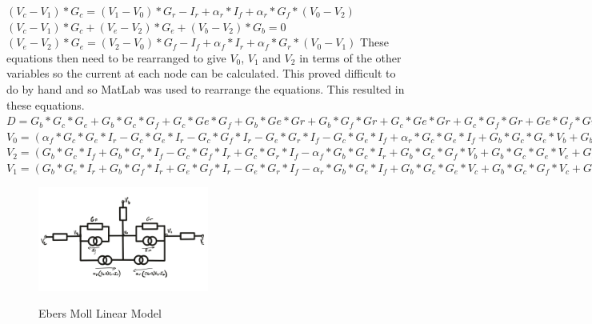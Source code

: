 \documentclass{article}
\begin{document}
$(V_c-V_1)*G_c = (V_1-V_0)*G_r - I_r + \alpha_r*I_f + \alpha_r*G_f*(V_0-V_2)$\bigbreak
$(V_c-V_1)*G_c + (V_e-V_2)*G_e + (V_b-V_2)*G_b = 0$\bigbreak
$(V_e-V_2)*G_e = (V_2-V_0)*G_f - I_f + \alpha_f*I_r + \alpha_f*G_r*(V_0-V_1)$\bigbreak
These equations then need to be rearranged to give $V_0$, $V_1$ and $V_2$ in terms of the other variables so the current at each node can be calculated. This proved difficult to do by hand and so MatLab was used to rearrange the equations. This resulted in these equations.\bigbreak
$D = G_b*G_c*G_e + G_b*G_c*G_f + G_c*Ge*G_f + G_b*Ge*Gr + G_b*G_f*Gr + G_c*Ge*Gr + G_c*G_f*Gr + Ge*G_f*Gr
            - \alpha_f*Gc_*G_e*G_r - \alpha_r*G_c*G_e*G_f - \alpha_f*\alpha_r*G_b*G_f*G_r - \alpha_f*\alpha_r*G_c*G_f*G_r - \alpha_f*\alpha_r*G_e*G_f*G_r$\bigbreak
$V_0 = (\alpha_f*G_c*G_e*I_r - G_c*G_e*I_r - G_c*G_f*I_r - G_e*G_r*I_f - G_c*G_e*I_f + \alpha_r*G_c*G_e*I_f + G_b*G_c*G_e*V_b + G_b*G_c*G_f*V_b + G_c*G_e*G_f*V_e + G_b*G_e*G_r*V_b + G_b*G_f*G_r*V_b + G_c*G_e*G_r*V_c + G_c*G_f*G_r*V_c + G_e*G_f*G_r*V_e + \alpha_f*\alpha_r*G_c*G_f*I_r + 
\alpha_f*\alpha_r*G_e*G_r*I_f - \alpha_f*G_c*G_e*G_r*V_c - \alpha_r*G_c*G_e*G_f*V_e - \alpha_f*\alpha_r*G_b*G_f*G_r*V_b - \alpha_f*\alpha_r*G_c*G_f*G_r*V_c - \alpha_f*\alpha_r*G_e*G_f*G_r*V_e)/D$\bigbreak
$V_2 = (G_b*G_c*I_f + G_b*G_r*I_f - G_c*G_f*I_r + G_c*G_r*I_f - \alpha_f*G_b*G_c*I_r + G_b*G_c*G_f*V_b + G_b*G_c*G_e*V_e + G_c*G_e*G_f*V_e + G_b*G_f*G_r*V_b + G_b*G_e*G_r*V_e + G_c*G_f*G_r*V_c + G_c*G_e*G_r*V_e + G_e*G_f*G_r*V_e - \alpha_f*\alpha_r*G_b*G_r*I_f + \alpha_f*\alpha_r*G_c*G_f*I_r - \alpha_f*\alpha_r*G_c*G_r*I_f - \alpha_f*G_b*G_c*G_r*V_b + \alpha_f*G_b*G_c*G_r*V_c - \alpha_f*G_c*G_e*G_r*V_e - \alpha_r*G_c*G_e*G_f*V_e - \alpha_f*\alpha_r*G_b*G_f*G_r*V_b - \alpha_f*\alpha_r*G_c*G_f*G_r*V_c - \alpha_f*\alpha_r*G_e*G_f*G_r*V_e)/D$\bigbreak
$V_1 = (G_b*G_e*I_r + G_b*G_f*I_r + G_e*G_f*I_r - G_e*G_r*I_f - \alpha_r*G_b*G_e*I_f + G_b*G_c*G_e*V_c + G_b*G_c*G_f*V_c + G_c*G_e*G_f*V_c + G_b*G_e*G_r*V_b + G_b*G_f*G_r*V_b + G_c*G_e*G_r*V_c + G_c*G_f*G_r*V_c + G_e*G_f*G_r*V_e - \alpha_f*\alpha_r*G_b*G_f*I_r - \alpha_f*\alpha_r*G_e*G_f*I_r + \alpha_f*\alpha_r*G_e*G_r*I_f - \alpha_r*G_b*G_e*G_f*V_b - \alpha_f*G_c*G_e*G_r*V_c - \alpha_r*G_c*G_e*G_f*V_c + \alpha_r*G_b*G_e*G_f*V_e - \alpha_f*\alpha_r*G_b*G_f*G_r*V_b - \alpha_f*\alpha_r*G_c*G_f*G_r*V_c - \alpha_f*\alpha_r*G_e*G_f*G_r*V_e)/D$\bigbreak
\begin{figure}[h]
    \caption{Ebers Moll Linear Model}
    \centering
    \includegraphics[width=0.5\textwidth]{images/LinearEbersMoll.png}
    \label{fig:LinearEbersMoll}
\end{figure}
\end{document}
